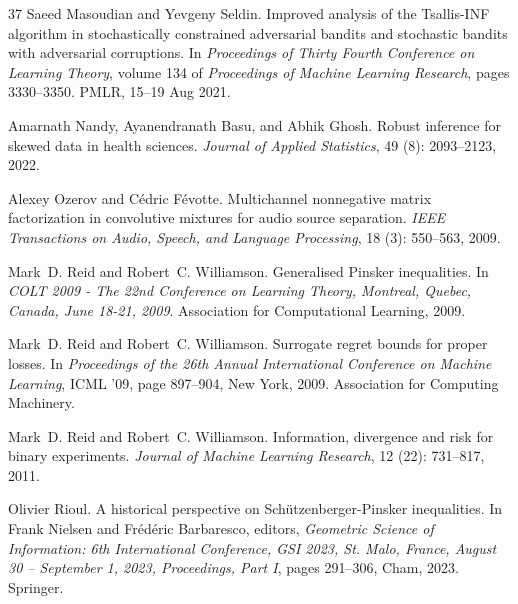 \documentclass[11pt,oneside,a4paper]{article}
\theoremstyle{plain}
\theoremstyle{definition}
\theoremstyle{remark}
\begin{document}
\begin{thebibliography}{37}
Saeed Masoudian and Yevgeny Seldin.
\newblock Improved analysis of the {Tsallis-INF} algorithm in stochastically constrained adversarial bandits and stochastic bandits with adversarial corruptions.
\newblock In \emph{Proceedings of Thirty Fourth Conference on Learning Theory}, volume 134 of \emph{Proceedings of Machine Learning Research}, pages 3330--3350. PMLR, 15--19 Aug 2021.

Amarnath Nandy, Ayanendranath Basu, and Abhik Ghosh.
\newblock Robust inference for skewed data in health sciences.
\newblock \emph{Journal of Applied Statistics}, 49 (8): 2093--2123, 2022.

Alexey Ozerov and C{\'e}dric F{\'e}votte.
\newblock Multichannel nonnegative matrix factorization in convolutive mixtures for audio source separation.
\newblock \emph{IEEE Transactions on Audio, Speech, and Language Processing}, 18 (3): 550--563, 2009.

Mark~D. Reid and Robert~C. Williamson.
\newblock Generalised {Pinsker} inequalities.
\newblock In \emph{{COLT} 2009 - The 22nd Conference on Learning Theory, Montreal, Quebec, Canada, June 18-21, 2009}. Association for Computational Learning, 2009{}.

Mark~D. Reid and Robert~C. Williamson.
\newblock Surrogate regret bounds for proper losses.
\newblock In \emph{Proceedings of the 26th Annual International Conference on Machine Learning}, ICML '09, page 897–904, New York, 2009{}. Association for Computing Machinery.

Mark~D. Reid and Robert~C. Williamson.
\newblock Information, divergence and risk for binary experiments.
\newblock \emph{Journal of Machine Learning Research}, 12 (22): 731--817, 2011.

Olivier Rioul.
\newblock A historical perspective on {S}ch{\"u}tzenberger-{P}insker inequalities.
\newblock In Frank Nielsen and Fr{\'e}d{\'e}ric Barbaresco, editors, \emph{Geometric Science of Information: 6th International Conference, GSI 2023, St. Malo, France, August 30 – September 1, 2023, Proceedings, Part I}, pages 291--306, Cham, 2023. Springer.


\end{thebibliography}
\end{document}
